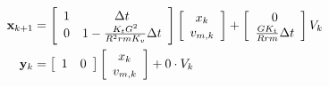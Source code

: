 \begin{align}
  \mathbf{x}_{k+1} &= \left[
  \begin{array}{cc}
    1 & \Delta t \\
    0 & 1 - \frac{K_t G^2}{R^2rmK_v} \Delta t
  \end{array}
  \right] \left[
  \begin{array}{c}
    x_k \\
    v_{m,k} \\
  \end{array}
  \right] + \left[
  \begin{array}{c}
    0 \\
    \frac{GK_t}{Rrm} \Delta t
  \end{array}
  \right] V_k \\
  \mathbf{y}_k &= \left[
  \begin{array}{cc}
    1 & 0
  \end{array}
  \right] \left[
  \begin{array}{c}
    x_k \\
    v_{m,k} \\
  \end{array}
  \right] + 0 \cdot V_k
\end{align}
